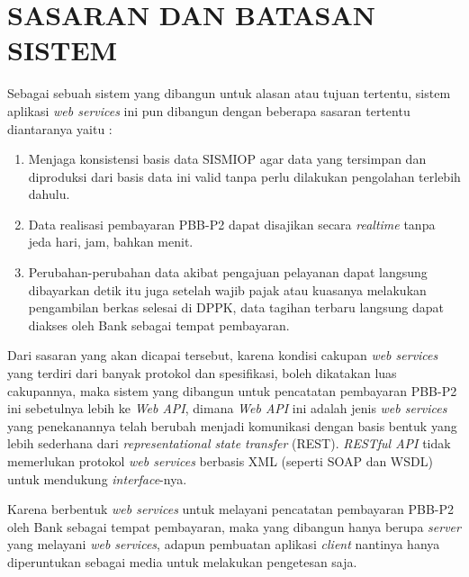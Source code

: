 \chapter{SASARAN DAN BATASAN SISTEM}

Sebagai sebuah sistem yang dibangun untuk alasan atau tujuan tertentu, sistem aplikasi \textit{web services} ini pun dibangun dengan beberapa sasaran tertentu diantaranya yaitu :

\begin{enumerate}[1.]
  \item Menjaga konsistensi basis data SISMIOP agar data yang tersimpan dan diproduksi dari basis data ini valid tanpa perlu dilakukan pengolahan terlebih dahulu.
  
  \item Data realisasi pembayaran PBB-P2 dapat disajikan secara \textit{realtime} tanpa jeda hari, jam, bahkan menit.
  
  \item Perubahan-perubahan data akibat pengajuan pelayanan dapat langsung dibayarkan detik itu juga setelah wajib pajak atau kuasanya melakukan pengambilan berkas selesai di DPPK, data tagihan terbaru langsung dapat diakses oleh Bank sebagai tempat pembayaran.
\end{enumerate}

Dari sasaran yang akan dicapai tersebut, karena kondisi cakupan \textit{web services} yang terdiri dari banyak protokol dan spesifikasi, boleh dikatakan luas cakupannya, maka sistem yang dibangun untuk pencatatan pembayaran PBB-P2 ini sebetulnya lebih ke \textit{Web API}, dimana \textit{Web API} ini adalah jenis \textit{web services} yang penekanannya telah berubah menjadi komunikasi dengan basis bentuk yang lebih sederhana dari \textit{representational state transfer} (REST). \textit{RESTful API} tidak memerlukan protokol \textit{web services} berbasis XML (seperti SOAP dan WSDL) untuk mendukung \textit{interface}-nya.

Karena berbentuk \textit{web services} untuk melayani pencatatan pembayaran PBB-P2 oleh Bank sebagai tempat pembayaran, maka yang dibangun hanya berupa \textit{server} yang melayani \textit{web services}, adapun pembuatan aplikasi \textit{client} nantinya hanya diperuntukan sebagai media untuk melakukan pengetesan saja.